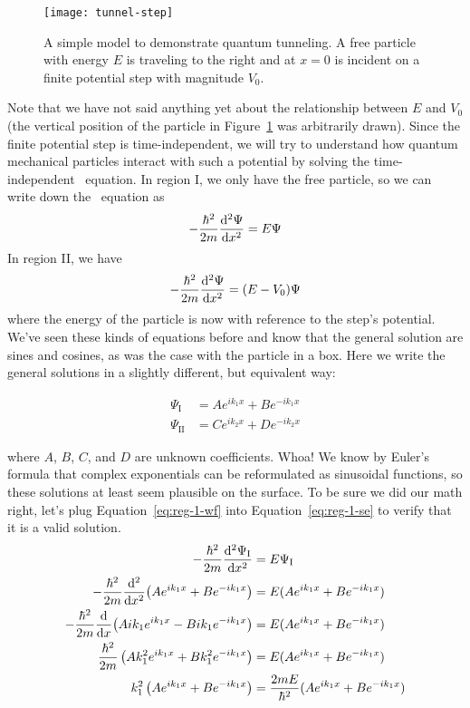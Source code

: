 \begin{figure}[!h]
	\centering
	\texttt{[image: tunnel-step]}
	\caption{A simple model to demonstrate quantum tunneling. A free particle with energy $E$ is traveling to the right and at $x=0$ is incident on a finite potential step with magnitude $V_0$.}
	\label{fig:tunnel-step}
\end{figure}

Note that we have not said anything yet about the relationship between $E$ and $V_0$ (the vertical position of the particle in Figure~\ref{fig:tunnel-step} was arbitrarily drawn). Since the finite potential step is time-independent, we will try to understand how quantum mechanical particles interact with such a potential by solving the time-independent \Sch\ equation. In region I, we only have the free particle, so we can write down the \Sch\ equation as 
\begin{equation}
	-\frac{\hbar^2}{2m} \dv[2]{\Psi}{x} = E\Psi \label{eq:reg-1-se}
\end{equation}
In region II, we have
\begin{equation}
	-\frac{\hbar^2}{2m} \dv[2]{\Psi}{x} = (E-V_0)\Psi \label{eq:reg-2-se}
\end{equation}
where the energy of the particle is now with reference to the step's potential. We've seen these kinds of equations before and know that the general solution are sines and cosines, as was the case with the particle in a box. Here we write the general solutions in a slightly different, but equivalent way:
\begin{tcolorbox}[title = Traveling wave solutions] \vspace{-2ex}
	\begin{align}
		\Psi_{\text{I}} &= Ae^{ik_1x} + Be^{-ik_1x} \label{eq:reg-1-wf} \\
		\Psi_{\text{II}} &= Ce^{ik_2x} + De^{-ik_2x} \label{eq:reg-2-wf} 
	\end{align}
\end{tcolorbox}
where $A$, $B$, $C$, and $D$ are unknown coefficients. Whoa! We know by Euler's formula that complex exponentials can be reformulated as sinusoidal functions, so these solutions at least seem plausible on the surface. To be sure we did our math right, let's plug Equation~\ref{eq:reg-1-wf} into Equation~\ref{eq:reg-1-se} to verify that it is a valid solution.
\begin{align*}
	-\frac{\hbar^2}{2m} \dv[2]{\Psi_{\text{I}}}{x} &= E\Psi_{\text{I}} \\
	-\frac{\hbar^2}{2m} \dv[2]{x}(Ae^{ik_1x} + Be^{-ik_1x}) &= E(Ae^{ik_1x} + Be^{-ik_1x}) \\
	-\frac{\hbar^2}{2m} \dv{x}(Aik_1e^{ik_1x} - Bik_1e^{-ik_1x}) &= E(Ae^{ik_1x} + Be^{-ik_1x}) \\
	\frac{\hbar^2}{2m} \left(Ak_1^2e^{ik_1x} + Bk_1^2e^{-ik_1x}\right) &= E(Ae^{ik_1x} + Be^{-ik_1x}) \\
	k_1^2\left(Ae^{ik_1x} + Be^{-ik_1x}\right) &= \frac{2mE}{\hbar^2}(Ae^{ik_1x} + Be^{-ik_1x})
\end{align*}


